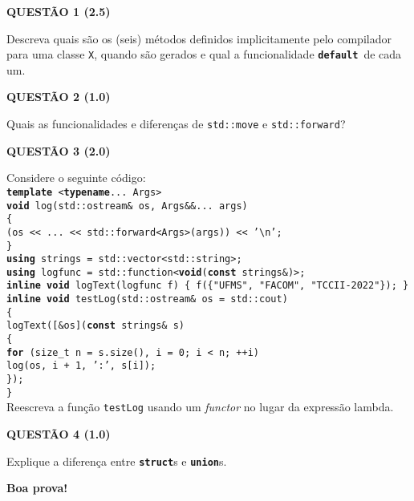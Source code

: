 \documentclass[12pt]{article}
\newcommand{\kw}[1]{{\color{myblue}\texttt{\textbf{#1}}}}
\newcommand{\sym}[1]{{\color{mygreen}\texttt{#1}}}
\begin{document}
\vspace{5mm}
\noindent
{\bf QUESTÃO 1 (2.5)}

\noindent
Descreva quais são os (seis) métodos definidos implicitamente pelo compilador para uma classe \sym{X}, quando são gerados e qual a funcionalidade \kw{default}\ de cada um.

\vspace{5mm}
\noindent
{\bf QUESTÃO 2 (1.0)}

\noindent
Quais as funcionalidades e diferenças de \texttt{std::move} e \texttt{std::forward}?

\vspace{5mm}
\noindent
{\bf QUESTÃO 3 (2.0)}

\noindent
Considere o seguinte código:\\[1.5ex]
\texttt{\kw{template}\ <\kw{typename}... \sym{Args}>}\\
\texttt{\kw{void}\ log(std::\sym{ostream}\& os, \sym{Args}\&\&... args)}\\
\texttt{\{}\\
\hspace*{1em}\texttt{(os << ... << std::forward<\sym{Args}>(args)) << '\textbackslash{n}';}\\
\texttt{\}}\\[1.5ex]
\texttt{\kw{using}\ \sym{strings} = std::\sym{vector}<std::\sym{string}>;}\\
\texttt{\kw{using}\ \sym{logfunc} = std::\sym{function}<\kw{void}(\kw{const}\ \sym{strings}\&)>;}\\[1.5ex]
\texttt{\kw{inline void}\ logText(\sym{logfunc}\ f) \{ f(\{"UFMS", "FACOM", "TCCII-2022"\}); \}}\\[1.5ex]
\texttt{\kw{inline void}\ testLog(std::\sym{ostream}\& os = std::cout)}\\
\texttt{\{}\\
\hspace*{1em}\texttt{logText([\&os](\kw{const}\ \sym{strings}\& s)}\\
\hspace*{2em}\texttt{\{}\\
\hspace*{3em}\texttt{\kw{for}\ (\sym{size\_t} n = s.size(), i = 0; i < n; ++i)}\\
\hspace*{4em}\texttt{log(os, i + 1, ':', s[i]);}\\
\hspace*{2em}\texttt{\});}\\
\texttt{\}}\\[1.5ex]
Reescreva a função \texttt{testLog} usando um \emph{functor} no lugar da expressão lambda.

\vspace{5mm}
\noindent
{\bf QUESTÃO 4 (1.0)}

\noindent
Explique a diferença entre \kw{struct}s e \kw{union}s.

\vspace{1cm}
\centerline{\bf Boa prova!}
\end{document}
